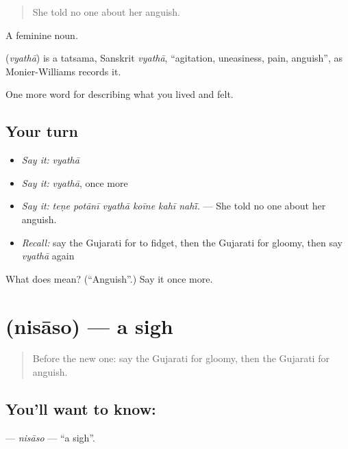 \begin{quote}
She told no one about her anguish.
\end{quote}

A feminine noun.

\begin{cousinweb}
\textbf{} (\emph{vyathā}) is a tatsama, Sanskrit \emph{vyathā}, \textquotedblleft{}agitation, uneasiness, pain, anguish\textquotedblright{}, as Monier-Williams records it.
\end{cousinweb}

\begin{grammarlens}[title={What you've built}]
One more word for describing what you lived and felt.
\end{grammarlens}

\subsection*{Your turn}
\begin{itemize}
\raggedright
  \item \emph{Say it:} \emph{vyathā}
  \item \emph{Say it:} \emph{vyathā}, once more
  \item \emph{Say it:} \emph{teṇe potānī vyathā koīne kahī nahī̃.} — She told no one about her anguish.
  \item \emph{Recall:} say the Gujarati for to fidget, then the Gujarati for gloomy, then say \emph{vyathā} again
\end{itemize}

\begin{tcolorbox}[breakable,colback=teal!4,colframe=teal!35!black,title={Before you move on}]
What does  mean? (\textquotedblleft{}Anguish\textquotedblright{}.) Say it once more.
\end{tcolorbox}
\section[\texorpdfstring{\gu{નિસાસો} (nisāso)}{નિસાસો (nisāso)}]{ (nisāso) — a sigh}

\label{lesson:GU-C455-nisaso}



\begin{quote}
Before the new one: say the Gujarati for gloomy, then the Gujarati for anguish.
\end{quote}

\subsection*{You'll want to know: }
\textbf{} — \emph{nisāso} — \textquotedblleft{}a sigh\textquotedblright{}.

